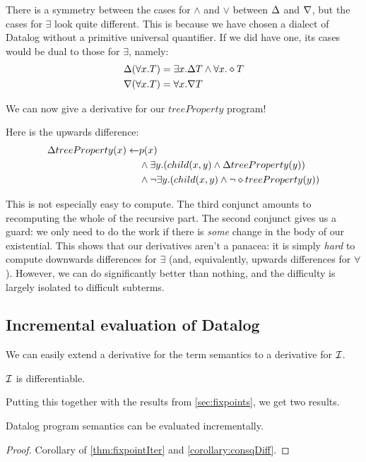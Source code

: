 There is a symmetry between the cases for $\wedge$ and $\vee$ between $\Delta$
and $\nabla$, but the cases for $\exists$ look quite different.
This is because we have chosen a dialect of Datalog without a primitive universal quantifier.
If we did have one, its cases would be dual to those for $\exists$, namely:
\begin{align*}
\Delta(\forall x.T) &= \exists x. \Delta T \wedge \forall x. \diamond T\\
\nabla(\forall x.T) &= \forall x. \nabla T
\end{align*}

We can now give a derivative for our $treeProperty$ program!

Here is the upwards difference:
\begin{align*}
  \Delta treeProperty(x) \leftarrow & p(x)\\
    &\wedge
    \exists y. (
      child(x, y)
      \wedge
      \Delta treeProperty(y)
    )\\
    &\wedge 
    \neg \exists y. (
      child(x, y)
      \wedge
      \neg \diamond treeProperty(y)
    )
\end{align*}

This is not especially easy to compute. The third conjunct amounts to
recomputing the whole of the recursive part. The second conjunct gives us a
guard: we only need to do the work if there is \emph{some} change in the body of
our existential. This shows that our derivatives aren't a panacea: it is simply \emph{hard} to compute
downwards differences for $\exists$ (and, equivalently, upwards differences for
$\forall$). However, we can do significantly better than nothing, and the
difficulty is largely isolated to difficult subterms.

\subsection{Incremental evaluation of Datalog}

We can easily extend a derivative for the term semantics to a derivative for $\mathcal{I}$.

\begin{corollary}
\label{corollary:consqDiff}
  $\mathcal{I}$ is differentiable.
\end{corollary}

Putting this together with the results from \cref{sec:fixpoints}, we get two results.

\begin{thm}
\label{thm:diffEval}
  Datalog program semantics can be evaluated incrementally.
\end{thm}
\ifproofs
\begin{proof}
  Corollary of \cref{thm:fixpointIter} and \cref{corollary:consqDiff}.
\end{proof}
\fi

